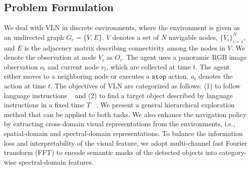 \documentclass[10pt,twocolumn,letterpaper]{article}
\begin{document}
\subsection{Problem Formulation}
\vspace{-0.1cm}
\font=2.2pt
We deal with VLN in discrete environments, where the environment is given as an undirected graph $G_e=\{V, E\}$. $V$ denotes a set of $N$ navigable nodes, $\{V_i\}^N_{i=1}$, and $E$ is the adjacency matrix describing connectivity among the nodes in $V$. We denote the observation at node $V_i$ as $O_i$. The agent uses a panoramic RGB image observation $o_t$ and current node $v_t$, which are collected at time $t$. The agent either moves to a neighboring node or executes a $\texttt{stop}$ action. $a_t$ denotes the action at time $t$. The objectives of VLN are categorized as follows: (1) to follow language instructions ~\cite{anderson2018vision} and (2) to find a target object described by language instructions in a fixed time $T$ ~\cite{zhu2021soon, qi2020reverie}. We present a general hierarchical exploration method that can be applied to both tasks. We also enhance the navigation policy by extracting cross-domain visual representations from the environments, i.e., spatial-domain and spectral-domain representations. To balance the information loss and interpretability of the visual feature, we adopt multi-channel fast Fourier transform (FFT) to encode semantic masks of the detected objects into category-wise spectral-domain features.
\font=2.5pt
\vspace{-0.1cm}
\end{document}
